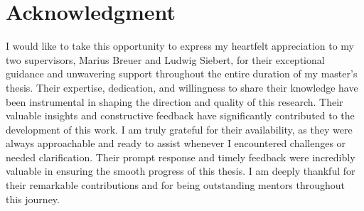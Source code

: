 \chapter*{Acknowledgment}
I would like to take this opportunity to express my heartfelt appreciation to my two supervisors, Marius Breuer and Ludwig Siebert, for their exceptional guidance and unwavering support throughout the entire duration of my master's thesis. Their expertise, dedication, and willingness to share their knowledge have been instrumental in shaping the direction and quality of this research. Their valuable insights and constructive feedback have significantly contributed to the development of this work. I am truly grateful for their availability, as they were always approachable and ready to assist whenever I encountered challenges or needed clarification. Their prompt response and timely feedback were incredibly valuable in ensuring the smooth progress of this thesis. I am deeply thankful for their remarkable contributions and for being outstanding mentors throughout this journey.
